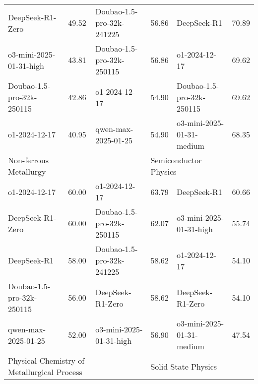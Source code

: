 {\begin{longtable}{p{4.2cm}>{\centering\arraybackslash} p{0.8cm}|p{4.2cm} >{\centering\arraybackslash} p{0.8cm}|p{4.2cm} >{\centering\arraybackslash} p{0.8cm}}
\cellcolor{blue!5} DeepSeek-R1-Zero & \cellcolor{blue!2}49.52 & \cellcolor{yellow!5} Doubao-1.5-pro-32k-241225 & \cellcolor{yellow!2} 56.86 & \cellcolor{green!5} DeepSeek-R1 & \cellcolor{green!2} 70.89\\
\cellcolor{blue!5} o3-mini-2025-01-31-high & \cellcolor{blue!2}43.81 & \cellcolor{yellow!5} Doubao-1.5-pro-32k-250115 & \cellcolor{yellow!2} 56.86 & \cellcolor{green!5} o1-2024-12-17 & \cellcolor{green!2} 69.62\\
\cellcolor{blue!5} Doubao-1.5-pro-32k-250115 & \cellcolor{blue!2}42.86 & \cellcolor{yellow!5} o1-2024-12-17 & \cellcolor{yellow!2} 54.90 & \cellcolor{green!5} Doubao-1.5-pro-32k-250115 & \cellcolor{green!2} 69.62\\
\cellcolor{blue!5} o1-2024-12-17 & \cellcolor{blue!2}40.95 & \cellcolor{yellow!5} qwen-max-2025-01-25 & \cellcolor{yellow!2} 54.90 & \cellcolor{green!5} o3-mini-2025-01-31-medium & \cellcolor{green!2} 68.35\\
\hline
\multicolumn{2}{p{5.15cm}|}{\cellcolor{blue!10} \centering Non-ferrous Metallurgy} & \multicolumn{2}{p{5.15cm}|}{\cellcolor{yellow!10} \centering Oncology} & \multicolumn{2}{p{5.15cm}}{\cellcolor{green!10} \centering Semiconductor Physics}\\
\hline
\cellcolor{blue!5} o1-2024-12-17 & \cellcolor{blue!2}60.00 & \cellcolor{yellow!5} o1-2024-12-17 & \cellcolor{yellow!2} 63.79 & \cellcolor{green!5} DeepSeek-R1 & \cellcolor{green!2} 60.66\\
\cellcolor{blue!5} DeepSeek-R1-Zero & \cellcolor{blue!2}60.00 & \cellcolor{yellow!5} Doubao-1.5-pro-32k-250115 & \cellcolor{yellow!2} 62.07 & \cellcolor{green!5} o3-mini-2025-01-31-high & \cellcolor{green!2} 55.74\\
\cellcolor{blue!5} DeepSeek-R1 & \cellcolor{blue!2}58.00 & \cellcolor{yellow!5} Doubao-1.5-pro-32k-241225 & \cellcolor{yellow!2} 58.62 & \cellcolor{green!5} o1-2024-12-17 & \cellcolor{green!2} 54.10\\
\cellcolor{blue!5} Doubao-1.5-pro-32k-250115 & \cellcolor{blue!2}56.00 & \cellcolor{yellow!5} DeepSeek-R1-Zero & \cellcolor{yellow!2} 58.62 & \cellcolor{green!5} DeepSeek-R1-Zero & \cellcolor{green!2} 54.10\\
\cellcolor{blue!5} qwen-max-2025-01-25 & \cellcolor{blue!2}52.00 & \cellcolor{yellow!5} o3-mini-2025-01-31-high & \cellcolor{yellow!2} 56.90 & \cellcolor{green!5} o3-mini-2025-01-31-medium & \cellcolor{green!2} 47.54\\
\hline
\multicolumn{2}{p{5.15cm}|}{\cellcolor{blue!10} \centering Physical Chemistry of Metallurgical Process} & \multicolumn{2}{p{5.15cm}|}{\cellcolor{yellow!10} \centering Ophthalmology} & \multicolumn{2}{p{5.15cm}}{\cellcolor{green!10} \centering Solid State Physics}\\

\end{longtable}}
